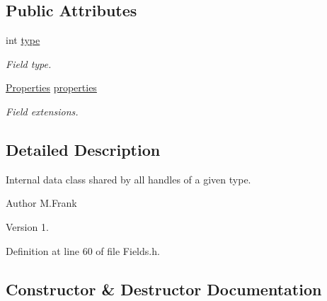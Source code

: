 \subsection*{Public Attributes}
\begin{DoxyCompactItemize}
\item 
int \hyperlink{class_d_d4hep_1_1_geometry_1_1_cartesian_field_1_1_object_a661abde32b68651dc0542aabbe9e448c}{type}
\begin{DoxyCompactList}\small\item\em Field type. \end{DoxyCompactList}\item 
\hyperlink{class_d_d4hep_1_1_geometry_1_1_cartesian_field_a37a636b9f5ee9ead172cca958dacb920}{Properties} \hyperlink{class_d_d4hep_1_1_geometry_1_1_cartesian_field_1_1_object_a146cdd5fa292df237112a461ccaa0f6c}{properties}
\begin{DoxyCompactList}\small\item\em Field extensions. \end{DoxyCompactList}\end{DoxyCompactItemize}


\subsection{Detailed Description}
Internal data class shared by all handles of a given type. 

\begin{DoxyAuthor}{Author}
M.\+Frank 
\end{DoxyAuthor}
\begin{DoxyVersion}{Version}
1. 
\end{DoxyVersion}


Definition at line 60 of file Fields.\+h.



\subsection{Constructor \& Destructor Documentation}
\hypertarget{class_d_d4hep_1_1_geometry_1_1_cartesian_field_1_1_object_ae9c0b05f25b59b27e047ddf7538dbe2b}{}\label{class_d_d4hep_1_1_geometry_1_1_cartesian_field_1_1_object_ae9c0b05f25b59b27e047ddf7538dbe2b} 
